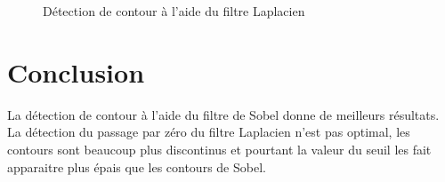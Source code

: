 \documentclass{article}
\begin{document}
\begin{figure}[!ht]%
  \centering
  \hspace{0.030\textwidth}
  \caption{Détection de contour à l'aide du filtre Laplacien}
  \label{laplacec:init}
\end{figure}

\section{Conclusion}
La détection de contour à l'aide du filtre de Sobel donne de meilleurs résultats.
La détection du passage par zéro du filtre Laplacien n'est pas optimal, les contours sont beaucoup plus discontinus et
pourtant la valeur du seuil les fait apparaitre plus épais que les contours de Sobel.


\end{document}
